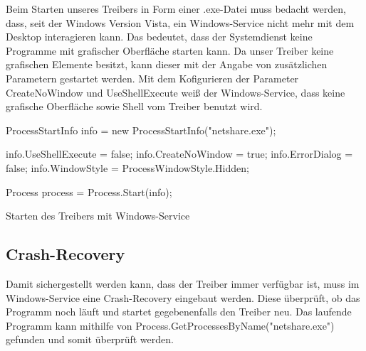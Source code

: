 Beim Starten unseres Treibers in Form einer .exe-Datei muss bedacht werden, dass, seit der Windows Version Vista, ein Windows-Service nicht mehr mit dem Desktop interagieren kann. Das bedeutet, dass der Systemdienst keine Programme mit grafischer Oberfläche starten kann. Da unser Treiber keine grafischen Elemente besitzt, kann dieser mit der Angabe von zusätzlichen Parametern gestartet werden.
Mit dem Kofigurieren der Parameter CreateNoWindow und UseShellExecute weiß der Windows-Service, dass keine grafische Oberfläche sowie Shell vom Treiber benutzt wird.

\begin{program}[H]
\begin{CSharpCode}
ProcessStartInfo info = new ProcessStartInfo("netshare.exe");

info.UseShellExecute = false;
info.CreateNoWindow = true;
info.ErrorDialog = false;
info.WindowStyle = ProcessWindowStyle.Hidden;

Process process = Process.Start(info);
\end{CSharpCode}
\caption{Starten des Treibers mit Windows-Service}
\end{program}

\subsection{Crash-Recovery}

Damit sichergestellt werden kann, dass der Treiber immer verfügbar ist, muss im Windows-Service eine Crash-Recovery eingebaut werden. Diese überprüft, ob das Programm noch läuft und startet gegebenenfalls den Treiber neu. Das laufende Programm kann mithilfe von \mbox{Process.GetProcessesByName("netshare.exe")} gefunden und somit überprüft werden.